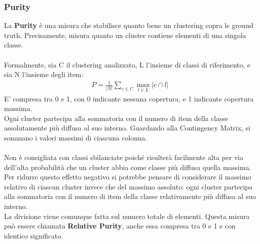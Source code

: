 \subsubsection{Purity}
La \textbf{Purity} è una misura che stabilisce quanto bene un clustering copra le ground truth. Precisamente, misura quanto un cluster contiene elementi di una singola classe.\\
\\
Formalmente, sia C il clustering analizzato, L l'insieme di classi di riferimento, e sia N l'insieme degli item:
\begin{align}
P = \frac{1}{|N|}\sum_{c \in C}\max_{l \in L}|c \cap l|
\end{align}
E' compresa tra 0 e 1, con 0 indicante nessuna copertura, e 1 indicante copertura massima.\\
Ogni cluster partecipa alla sommatoria con il numero di item della classe assolutamente più diffusa al suo interno. Guardando alla Contingency Matrix, si sommano i valori massimi di ciascuna colonna.\\
\\
Non è consigliata con classi sbilanciate poiché risulterà facilmente alta per via dell'alta probabilità che un cluster abbia come classe più diffusa quella massima.\\
Per ridurre questo effetto negativo si potrebbe pensare di considerare il massimo relativo di ciascun cluster invece che del massimo assoluto: ogni cluster partecipa alla sommatoria con il numero di item della classe relativamente più diffusa al suo interno.\\
La divisione viene comunque fatta sul numero totale di elementi. Questa misura può essere chiamata \textbf{Relative Purity}, anche essa compresa tra 0 e 1 e con identico significato.

